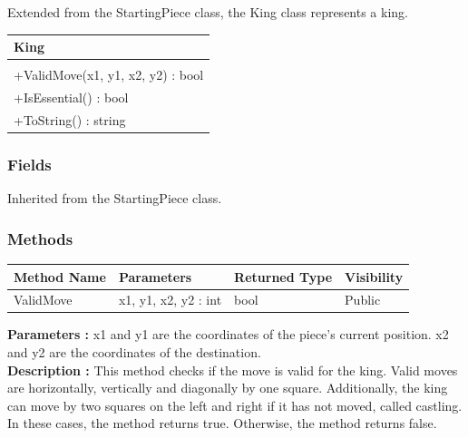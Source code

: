 \documentclass[12pt]{article}
\begin{document}
    Extended from the StartingPiece class, the King class represents a king.
\begin{table}[H]
    \begin{tabular}{|l|}
    \hline
    \cellcolor[HTML]{C0C0C0}\textbf{King} \\ \hline
    \cellcolor[HTML]{EFEFEF}                    \\ \hline
    +ValidMove(x1, y1, x2, y2) : bool           \\ \hline
    +IsEssential() : bool                       \\ \hline
    +ToString() : string                        \\ \hline
    \end{tabular}
\end{table}

\subsubsection{Fields}

    Inherited from the StartingPiece class.

\subsubsection{Methods}

\begin{table}[H]
    \begin{tabular}{|l|l|l|l|}
    \hline
    \rowcolor[HTML]{EFEFEF} 
    \cellcolor[HTML]{EFEFEF}\textbf{Method Name} & \textbf{Parameters}  & \textbf{Returned Type} & \textbf{Visibility} \\ \hline
    ValidMove                          & x1, y1, x2, y2 : int & bool                   & Public              \\ \hline
    \end{tabular}
\end{table}

    \textbf{Parameters :} x1 and y1 are the coordinates of the piece's current position.
    x2 and y2 are the coordinates of the destination.  
\\
    \textbf{Description :} This method checks if the move is valid for the king. 
    Valid moves are horizontally, vertically and diagonally by one square.
    Additionally, the king can move by two squares on the left and right if it has not moved, called castling.
    In these cases, the method returns true.
    Otherwise, the method returns false.
\end{document}
